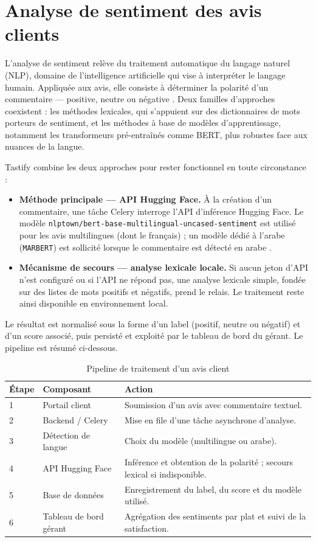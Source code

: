 \section{Analyse de sentiment des avis clients}
L'analyse de sentiment relève du traitement automatique du langage naturel (NLP), domaine de l'intelligence artificielle qui vise à interpréter le langage humain. Appliquée aux avis, elle consiste à déterminer la polarité d'un commentaire — positive, neutre ou négative \cite{huggingface}. Deux familles d'approches coexistent : les méthodes lexicales, qui s'appuient sur des dictionnaires de mots porteurs de sentiment, et les méthodes à base de modèles d'apprentissage, notamment les transformeurs pré-entraînés comme BERT, plus robustes face aux nuances de la langue.

Tastify combine les deux approches pour rester fonctionnel en toute circonstance :

\begin{itemize}[leftmargin=1.2cm]
  \item \textbf{Méthode principale --- API Hugging Face.} À la création d'un commentaire, une tâche Celery interroge l'API d'inférence Hugging Face. Le modèle \texttt{nlptown/bert-base-multilingual-uncased-sentiment} est utilisé pour les avis multilingues (dont le français) \cite{nlptown} ; un modèle dédié à l'arabe (\texttt{MARBERT}) est sollicité lorsque le commentaire est détecté en arabe \cite{marbert}.
  \item \textbf{Mécanisme de secours --- analyse lexicale locale.} Si aucun jeton d'API n'est configuré ou si l'API ne répond pas, une analyse lexicale simple, fondée sur des listes de mots positifs et négatifs, prend le relais. Le traitement reste ainsi disponible en environnement local.
\end{itemize}

Le résultat est normalisé sous la forme d'un label (positif, neutre ou négatif) et d'un score associé, puis persisté et exploité par le tableau de bord du gérant. Le pipeline est résumé ci-dessous.

\begin{table}[H]
\centering
\caption{Pipeline de traitement d'un avis client}
\begin{tabular}{p{1cm}p{4cm}p{8cm}}
\toprule
\textbf{Étape} & \textbf{Composant} & \textbf{Action} \\
\midrule
1 & Portail client & Soumission d'un avis avec commentaire textuel. \\
2 & Backend / Celery & Mise en file d'une tâche asynchrone d'analyse. \\
3 & Détection de langue & Choix du modèle (multilingue ou arabe). \\
4 & API Hugging Face & Inférence et obtention de la polarité ; secours lexical si indisponible. \\
5 & Base de données & Enregistrement du label, du score et du modèle utilisé. \\
6 & Tableau de bord gérant & Agrégation des sentiments par plat et suivi de la satisfaction. \\
\bottomrule
\end{tabular}
\end{table}

